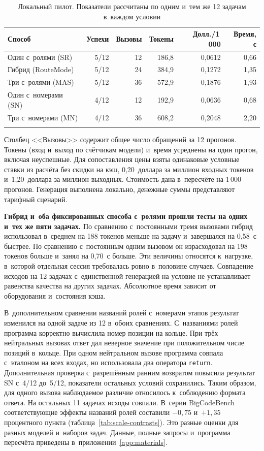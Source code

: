 \begin{table}[!ht]
\caption{Локальный пилот. Показатели рассчитаны по одним и~тем же 12 задачам в~каждом условии}\label{tab:pilot}
\centering\small\renewcommand{\arraystretch}{1.22}
\begin{tabular}{@{}lrrrrr@{}}
\toprule
Способ & Успехи & Вызовы & Токены & Долл./1\,000 & Время, с \\
\midrule
Один с~ролями (SR) & 5/12 & 12 & 186,8 & 0,0612 & 0,66 \\
Гибрид (RouteMode) & 5/12 & 24 & 384,9 & 0,1272 & 1,35 \\
Три с~ролями (MAS) & 5/12 & 36 & 572,9 & 0,1876 & 1,93 \\
\midrule
Один с~номерами (SN) & 4/12 & 12 & 192,9 & 0,0636 & 0,68 \\
Три с~номерами (MN) & 4/12 & 36 & 608,2 & 0,2048 & 2,20 \\
\botrule
\end{tabular}
\end{table}
\FloatBarrier

Столбец <<Вызовы>> содержит общее число обращений за 12 прогонов. Токены (вход и~выход по счётчикам модели) и~время усреднены на один прогон, включая неуспешные. Для сопоставления цены взяты одинаковые условные ставки из расчёта без скидки на кэш, 0,20~доллара за миллион входных токенов и~1,20~доллара за миллион выходных. Стоимость дана в~пересчёте на 1\,000 прогонов. Генерация выполнена локально, денежные суммы представляют тарифный сценарий.

\textbf{Гибрид и~оба фиксированных способа с~ролями прошли тесты на одних и~тех же пяти задачах.} По сравнению с~постоянными тремя вызовами гибрид использовал в~среднем на 188 токенов меньше на задачу и~завершался на 0,58~с быстрее. По сравнению с~постоянным одним вызовом он израсходовал на 198 токенов больше и~занял на 0,70~с больше. Эти величины относятся к~нагрузке, в~которой отдельная сессия требовалась ровно в~половине случаев. Совпадение исходов на 12 задачах с~единственной генерацией на условие не устанавливает равенства качества на других задачах. Абсолютное время зависит от оборудования и~состояния кэша.

В~дополнительном сравнении названий ролей с~номерами этапов результат изменился на одной задаче из 12 в~обоих сравнениях. С~названиями ролей программа корректно вычислила номер позиции на кольце. При трёх нейтральных вызовах ответ дал неверное значение при положительном числе позиций в~кольце. При одном нейтральном вызове программа совпала с~эталоном на всех входах, но использовала два оператора \texttt{return}. Дополнительная проверка с~разрешённым ранним возвратом повысила результат SN с~4/12 до~5/12, показатели остальных условий сохранились. Таким образом, для одного вызова наблюдаемое различие относилось к~соблюдению формата ответа. На остальных 11 задачах исходы совпали. В~серии BigCodeBench соответствующие эффекты названий ролей составили $-0{,}75$ и~$+1{,}35$ процентного пункта (таблица~\ref{tab:scale-contrasts}). Это разные оценки для разных моделей и~наборов задач. Данные, полные запросы и~программа пересчёта приведены в~приложении~\ref{app:materials}.
